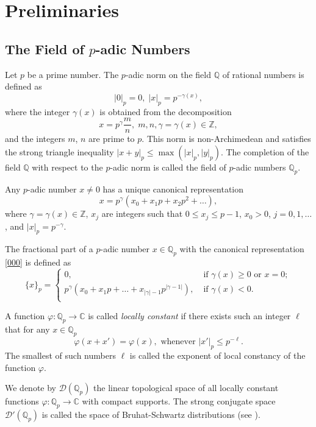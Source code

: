 \documentclass[14pt]{article}
\theoremstyle{theorem}
\theoremstyle{theorem}
\theoremstyle{definition}
\theoremstyle{lemma}
\newcommand{\Label}[1]{\label{#1}}
\numberwithin{equation}{section}
\begin{document}
\section{Preliminaries}

\subsection{The Field of $p$-adic Numbers}

Let $p$ be a prime number. The $p$-adic norm on the field $\mathbb{Q}$ of rational numbers is defined as
$$|0|_p=0,\;|x|_p=p^{-\gamma(x)},$$
where the integer $\gamma(x)$ is obtained from the decomposition
$$x=p^{\gamma}\frac{m}{n},\;m,n,\gamma=\gamma(x)\in\mathbb{Z},$$
and the integers $m$, $n$ are prime to $p$. This norm is non-Archimedean and satisfies the strong triangle inequality $|x+y|_p\leq\max\left(|x|_p,|y|_p\right)$. The completion of the field $\mathbb{Q}$ with respect to the $p$-adic norm is called the field of $p$-adic numbers $\mathbb{Q}_p$.

Any $p$-adic number $x\neq0$ has a unique canonical representation
\begin{equation}\Label{000}
x=p^{\gamma}(x_0+x_1p+x_2p^2+\dots),
\end{equation}
where $\gamma=\gamma(x)\in\mathbb{Z}$, $x_j$ are integers such that $0\leq x_j\leq p-1$, $x_0>0$, $j=0,1,\dots$, and $|x|_p=p^{-\gamma}$.

The fractional part of a $p$-adic number $x\in\mathbb{Q}_p$ with the canonical representation \eqref{000} is defined as
\begin{equation}\Label{001}
\{x\}_p=\left\{
\begin{array}{ll}
0,\;&\mbox{if }\gamma(x)\geq0\mbox{ or }x=0;\\
p^{\gamma}(x_0+x_1p+\dots+x_{|\gamma|-1}p^{|\gamma-1|}),\;&\mbox{if }\gamma(x)<0.\\
\end{array}
\right.
\end{equation}

A function $\varphi:\mathbb{Q}_p\to\mathbb{C}$ is called {\it locally constant} if there exists such an integer $\ell$ that for any $x\in\mathbb{Q}_p$
$$\varphi(x+x')=\varphi(x),\mbox{ whenever }|x'|_p\leq p^{-\ell}.$$
The smallest of such numbers $\ell$ is called the exponent of local constancy of the function $\varphi$.

We denote by $\mathcal{D}(\mathbb{Q}_p)$ the linear topological space of all locally constant functions $\varphi:\mathbb{Q}_p\to\mathbb{C}$ with compact supports. The strong conjugate space $\mathcal{D}'(\mathbb{Q}_p)$ is called the space of Bruhat-Schwartz distributions (see \cite{A}).
\end{document}
